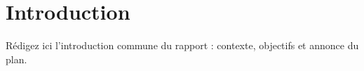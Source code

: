 \chapter{Introduction}
\label{chap:introduction}

Rédigez ici l'introduction commune du rapport : contexte, objectifs et annonce du plan.
